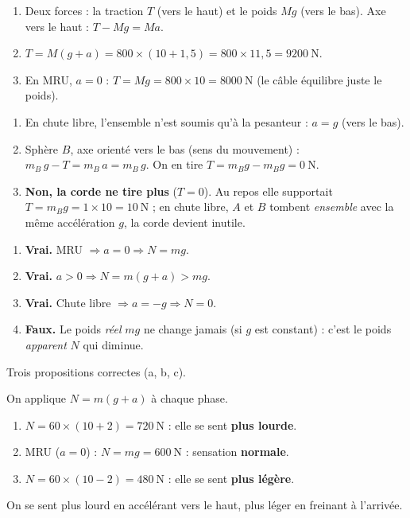 \documentclass[11pt,a4paper]{article}
\begin{document}

\begin{corrige}
\begin{enumerate}[label=\alph*)]
  \item Deux forces : la traction $T$ (vers le haut) et le poids $Mg$ (vers le bas).
        Axe vers le haut : $T-Mg=Ma$.
  \item $T=M(g+a)=800\times(10+1{,}5)=800\times 11{,}5=\qty{9200}{\newton}$.
  \item En MRU, $a=0$ : $T=Mg=800\times 10=\qty{8000}{\newton}$ (le câble équilibre
        juste le poids).
\end{enumerate}
\end{corrige}

\begin{corrige}
\begin{enumerate}[label=\alph*)]
  \item En chute libre, l'ensemble n'est soumis qu'à la pesanteur : $a=g$ (vers le bas).
  \item Sphère $B$, axe orienté vers le bas (sens du mouvement) :
        $m_B\,g-T=m_B\,a=m_B\,g$. On en tire $T=m_B g-m_B g=\qty{0}{\newton}$.
  \item \textbf{Non, la corde ne tire plus} ($T=0$). Au repos elle supportait
        $T=m_B g=1\times 10=\qty{10}{\newton}$ ; en chute libre, $A$ et $B$ tombent
        \emph{ensemble} avec la même accélération $g$, la corde devient inutile.
\end{enumerate}
\end{corrige}

\begin{corrige}
\begin{enumerate}[label=\alph*)]
  \item \textbf{Vrai.} MRU $\Rightarrow a=0\Rightarrow N=mg$.
  \item \textbf{Vrai.} $a>0\Rightarrow N=m(g+a)>mg$.
  \item \textbf{Vrai.} Chute libre $\Rightarrow a=-g\Rightarrow N=0$.
  \item \textbf{Faux.} Le poids \emph{réel} $mg$ ne change jamais (si $g$ est constant) :
        c'est le poids \emph{apparent} $N$ qui diminue.
\end{enumerate}
Trois propositions correctes (a, b, c).
\end{corrige}

\begin{corrige}
On applique $N=m(g+a)$ à chaque phase.
\begin{enumerate}[label=\alph*)]
  \item $N=60\times(10+2)=\qty{720}{\newton}$ : elle se sent \textbf{plus lourde}.
  \item MRU ($a=0$) : $N=mg=\qty{600}{\newton}$ : sensation \textbf{normale}.
  \item $N=60\times(10-2)=\qty{480}{\newton}$ : elle se sent \textbf{plus légère}.
\end{enumerate}
On se sent plus lourd en accélérant vers le haut, plus léger en freinant à l'arrivée.
\end{corrige}
\end{document}
